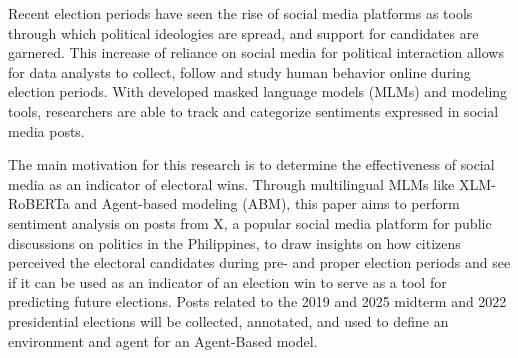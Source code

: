 \begin{thesisabstract}
Recent election periods have seen the rise of social media platforms as tools through which political ideologies are spread, and support for candidates are garnered. This increase of reliance on social media for political interaction allows for data analysts to collect, follow and study human behavior online during election periods. With developed masked language models (MLMs) and modeling tools, researchers are able to track and categorize sentiments expressed in social media posts.

The main motivation for this research is to determine the effectiveness of social media as an indicator of electoral wins. Through multilingual MLMs like XLM-RoBERTa and Agent-based modeling (ABM), this paper aims to perform sentiment analysis on posts from X, a popular social media platform for public discussions on politics in the Philippines, to draw insights on how citizens perceived the electoral candidates during pre- and proper election periods and see if it can be used as an indicator of an election win to serve as a tool for predicting future elections.  Posts related to the 2019 and 2025 midterm and 2022 presidential elections will be collected, annotated, and used to define an environment and agent for an Agent-Based model.
\end{thesisabstract}